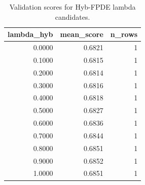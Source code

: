 \begin{table}[t]
\caption{Validation scores for Hyb-FPDE lambda candidates.}
\label{tab:lambda_distribution_computed}
\centering
\begin{tabular}{rrr}
\toprule
lambda\_hyb & mean\_score & n\_rows \\
\midrule
0.0000 & 0.6821 & 1 \\
0.1000 & 0.6815 & 1 \\
0.2000 & 0.6814 & 1 \\
0.3000 & 0.6816 & 1 \\
0.4000 & 0.6818 & 1 \\
0.5000 & 0.6827 & 1 \\
0.6000 & 0.6836 & 1 \\
0.7000 & 0.6844 & 1 \\
0.8000 & 0.6851 & 1 \\
0.9000 & 0.6852 & 1 \\
1.0000 & 0.6851 & 1 \\
\bottomrule
\end{tabular}

\end{table}
